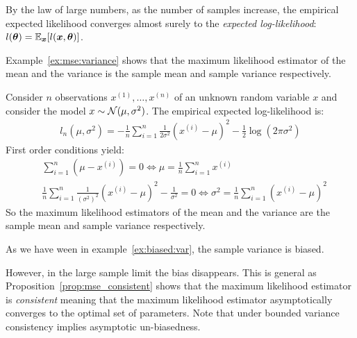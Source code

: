 By the law of large numbers, as the number of samples increase, the empirical
expected likelihood converges almost surely to the \emph{expected
  log-likelihood}: $l(\boldsymbol{\theta}) = \mathbb{E}_{\boldsymbol{x}}[l(\boldsymbol{x}, \boldsymbol{\theta})]$.

Example~\ref{ex:mse:variance} shows that the maximum likelihood estimator of the
mean and the variance is the sample mean and sample variance respectively.
\begin{example}
  \label{ex:mse:variance}
  Consider $n$ observations $x^{(1)}, \dots, x^{(n)}$ of an unknown random variable $x$
  and consider the model $x \sim \mathcal{N}(\mu, \sigma^2)$.
  The empirical expected log-likelihood is:
  \begin{align}
    l_n(\mu, \sigma^2) = -\frac1{n} \sum_{i=1}^n \frac1{2 \sigma^2}(x^{(i)} - \mu)^2 - \frac12 \log(2\pi \sigma^2)
  \end{align}
  First order conditions
  yield:
  \begin{align}
    &\sum_{i=1}^n (\mu - x^{(i)}) = 0 \iff \mu = \frac1{n} \sum_{i=1}^n x^{(i)} \\
    &\frac1{n} \sum_{i=1}^n \frac1{(\sigma^2)^2}(x^{(i)} - \mu)^2 - \frac1{\sigma^2} = 0 \iff \sigma^2 = \frac1{n} \sum_{i=1}^n(x^{(i)} - \mu)^2
  \end{align}
  So the maximum likelihood estimators of the mean and the variance are the
  sample mean and sample variance respectively.
\end{example}
As we have ween in example~\ref{ex:biased:var}, the sample variance is biased.

However, in the large sample limit the bias disappears. This is general as
Proposition~\ref{prop:mse_consistent} shows that the maximum likelihood
estimator is \emph{consistent} meaning that the maximum likelihood estimator
asymptotically converges to the optimal set of parameters. Note that under bounded variance consistency implies asymptotic un-biasedness.

